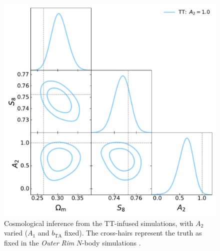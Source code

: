 \begin{figure}
\includegraphics[width=\columnwidth]{graphs/TT_a2.pdf}
\caption{Cosmological inference from the TT-infused simulations, with $A_2$ varied ($A_1$ and $b_\mathrm{TA}$ fixed). The cross-hairs represent the truth as fixed in the {\it Outer Rim} $N$-body simulations \citep{OuterRim}.}
\label{fig:triangle_tt_vary_a2}
\end{figure}
